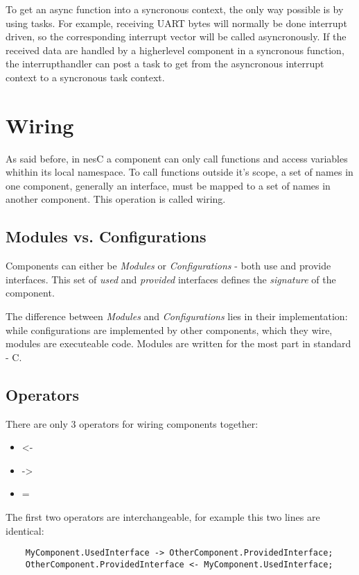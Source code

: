 To get an async function into a syncronous context, the only way possible is by using tasks. For example, receiving UART bytes will normally be done interrupt driven, so the corresponding interrupt vector will be called asyncronously. If the received data are handled by a higherlevel component in a syncronous function, the interrupthandler can post a task to get from the asyncronous interrupt context to a syncronous task context.

\section{Wiring}

As said before, in nesC a component can only call functions and access variables whithin its local namespace. To call functions outside it's scope, a set of names in one component, generally an interface, must be mapped to a set of names in another component. This operation is called wiring.

\subsection{Modules vs. Configurations}

Components can either be \textit{Modules} or \textit{Configurations} - both use and provide interfaces. This set of \textit{used} and \textit{provided} interfaces defines the \textit{signature} of the component.

The difference between \textit{Modules} and \textit{Configurations} lies in their implementation: while configurations are implemented by other components, which they wire, modules are executeable code. Modules are written for the most part in standard - C.

\subsection{Operators}

There are only 3 operators for wiring components together:

\begin{itemize}
 \item \textless-
 \item -\textgreater
 \item =
\end{itemize}

The first two operators are interchangeable, for example this two lines are identical:

\begin{lstlisting}
	MyComponent.UsedInterface -> OtherComponent.ProvidedInterface; 
	OtherComponent.ProvidedInterface <- MyComponent.UsedInterface;
\end{lstlisting}

